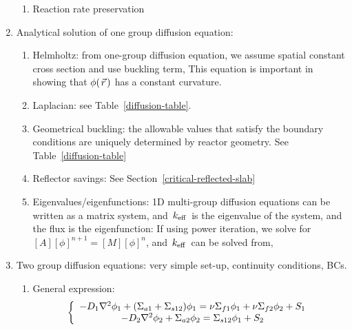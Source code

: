 \documentclass{school-22.211-notes}
\begin{document}
\begin{enumerate}
\begin{enumerate}
    \item Reaction rate preservation
  \end{enumerate}

\item Analytical solution of one group diffusion equation: 
  \begin{enumerate}
  \item Helmholtz: from one-group diffusion equation, we assume spatial constant cross section and use buckling term, 
  This equation is important in showing that $\phi(\left.\vec{r}\right.)$ has a constant curvature. 

  \item Laplacian: see Table~\ref{diffusion-table}.

  \item Geometrical buckling: the allowable values that satisfy the boundary conditions are uniquely determined by reactor geometry. See Table~\ref{diffusion-table}

  \item Reflector savings: See Section~\ref{critical-reflected-slab}

  \item Eigenvalues/eigenfunctions: 1D multi-group diffusion equations can be written as a matrix system, and $\left. k_{\mathrm{eff}} \right.$ is the eigenvalue of the system, and the flux is the eigenfunction: 
    If using power iteration, we solve for $[A][\phi]^{n+1} = [M] [\phi]^n$, and $\left. k_{\mathrm{eff}} \right.$ can be solved from,
  \end{enumerate}

\item Two group diffusion equations: very simple set-up, continuity conditions, BCs. 
  \begin{enumerate}
  \item General expression: 
    \begin{align}
      \left\{ \begin{array}{c}
        - D_1 \nabla^2 \phi_1 + (\Sigma_{a1} + \Sigma_{s12}) \phi_1 = \nu \Sigma_{f1} \phi_1 + \nu \Sigma_{f2} \phi_2 + S_1  \\
        - D_2 \nabla^2 \phi_2 + \Sigma_{a2} \phi_2 = \Sigma_{s12} \phi_1 + S_2
      \end{array} \right. 
    \end{align}


\end{enumerate}
\end{enumerate}
\end{document}
